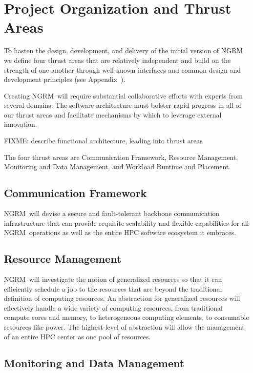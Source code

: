 \documentclass{article}
\newcommand{\ngrm}{NGRM}
\begin{document}
\section{Project Organization and Thrust Areas}
\label{sect:projorg}
To hasten the design, development, and delivery of the initial version
of \ngrm\, we define four thrust areas that are relatively independent
and build on the strength of one another through well-known interfaces
and common design and development principles (see Appendix~\cite{SWProcess}).

Creating \ngrm\ will require substantial collaborative efforts with
experts from several domains.
The software architecture must bolster rapid progress in all of our thrust
areas and facilitate mechanisms by which to leverage external innovation.

FIXME: describe functional architecture, leading into thrust areas

The four thrust areas are
Communication Framework,
Resource Management,
Monitoring and Data Management,
and Workload Runtime and Placement.

\subsection{Communication Framework}
\ngrm\ will devise a secure and fault-tolerant backbone communication
infrastructure that can provide requisite scalability and flexible
capabilities for all \ngrm\ operations as well as the entire HPC
software ecosystem it embraces.

\subsection{Resource Management}

\ngrm\ will investigate the notion of generalized resources so that
it can efficiently schedule a job to the resources that are beyond the
traditional definition of computing resources. An abstraction for
generalized resources will effectively handle a wide variety of computing
resources, from traditional compute cores and memory, to heterogeneous
computing elements, to consumable resources like power.
The highest-level of abstraction will allow the management of an
entire HPC center as one pool of resources.

\subsection{Monitoring and Data Management}
\end{document}
